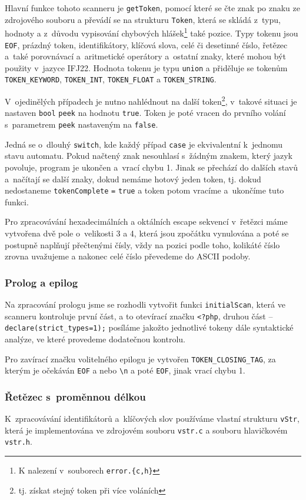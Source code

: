 \documentclass[a4paper,12pt]{article}
\begin{document}
Hlavní funkce tohoto scanneru je \verb|getToken|, pomocí které se čte znak po znaku ze zdrojového souboru a převádí se na strukturu \verb|Token|, která se skládá z~typu, hodnoty a z~důvodu vypisování chybových hlášek\footnote{K nalezení v~souborech \verb|error.{c,h}|} také pozice. Typy tokenu jsou \verb|EOF|, prázdný token, identifikátory, klíčová slova, celé či desetinné číslo, řetězec a~také porovnávací a~aritmetické operátory a~ostatní znaky, které mohou být použity v~jazyce IFJ22. Hodnota tokenu je typu \verb|union| a přiděluje se tokenům \verb|TOKEN_KEYWORD|, \verb|TOKEN_INT|, \verb|TOKEN_FLOAT| a \verb|TOKEN_STRING|.

V~ojedinělých případech je nutno nahlédnout na další token\footnote{tj. získat stejný token při více voláních}, v~takové situaci je nastaven \verb|bool| \verb|peek| na hodnotu \verb|true|. Token je poté vracen do prvního volání s~parametrem \verb|peek| nastaveným na \verb|false|.
 
Jedná se o~dlouhý \verb|switch|, kde každý případ \verb|case| je ekvivalentní k~jednomu stavu automatu. Pokud načtený znak nesouhlasí s~žádným znakem, který jazyk povoluje, program je ukončen a~vrací chybu 1. Jinak se přechází do dalších stavů a~načítají se další znaky, dokud nemáme hotový jeden token, tj. dokud nedostaneme \verb|tokenComplete| \verb|=| \verb|true| a token potom vracíme a~ukončíme tuto funkci. 

Pro zpracovávání hexadecimálních a oktálních escape sekvencí v~řetězci máme vytvořena dvě pole o~velikosti 3 a 4, která jsou zpočátku vynulována a poté se postupně
naplňují přečtenými čísly, vždy na pozici podle toho, kolikáté číslo zrovna uvažujeme a nakonec celé číslo převedeme do ASCII podoby.

\subsubsection{Prolog a epilog}
Na zpracování prologu jsme se rozhodli vytvořit funkci \verb|initialScan|, která ve scanneru kontroluje první část, a to otevírací značku \verb|<?php|, druhou část -- \verb|declare(strict_types=1);| posíláme jakožto jednotlivé tokeny dále syntaktické analýze, ve které provedeme dodatečnou kontrolu.

Pro zavírací značku volitelného epilogu je vytvořen \verb|TOKEN_CLOSING_TAG|, za kterým je očekáván \verb|EOF| a nebo \verb|\n| a poté \verb|EOF|, jinak vrací chybu 1.

\subsubsection{Řetězec s~proměnnou délkou}
K~zpracovávání identifikátorů a~klíčových slov používáme vlastní strukturu \verb|vStr|, která je implementována ve zdrojovém souboru \verb|vstr.c| a souboru hlavičkovém \verb|vstr.h|.
\end{document}
